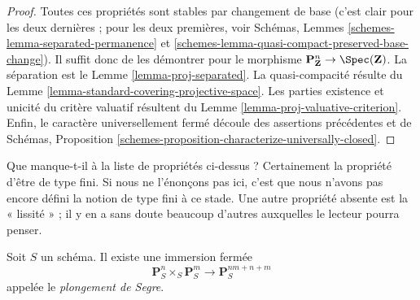 \begin{proof}
Toutes ces propriétés sont stables par changement de base (c'est clair pour
les deux dernières ; pour les deux premières, voir Schémas, Lemmes
\ref{schemes-lemma-separated-permanence} et
\ref{schemes-lemma-quasi-compact-preserved-base-change}). Il suffit donc de les
démontrer pour le morphisme
$\mathbf{P}^n_{\mathbf{Z}} \to \Spec(\mathbf{Z})$.
La séparation est le Lemme \ref{lemma-proj-separated}. La quasi-compacité
résulte du Lemme \ref{lemma-standard-covering-projective-space}.
Les parties existence et unicité du critère valuatif résultent du
Lemme \ref{lemma-proj-valuative-criterion}.
Enfin, le caractère universellement
fermé découle des assertions précédentes et de Schémas,
Proposition \ref{schemes-proposition-characterize-universally-closed}.
\end{proof}

\begin{remark}
\label{remark-missing-finite-type}
Que manque-t-il à la liste de propriétés ci-dessus ? Certainement la propriété
d'être de type fini. Si nous ne l'énonçons pas ici, c'est que nous n'avons pas
encore défini la notion de type fini à ce stade. Une autre propriété absente
est la « lissité » ; il y en a sans doute beaucoup d'autres auxquelles le
lecteur pourra penser.
\end{remark}

\begin{lemma}
\label{lemma-segre-embedding}
Soit $S$ un schéma. Il existe une immersion fermée
$$
\mathbf{P}^n_S \times_S \mathbf{P}^m_S
\longrightarrow
\mathbf{P}^{nm + n + m}_S
$$
appelée le {\it plongement de Segre}.
\end{lemma}

